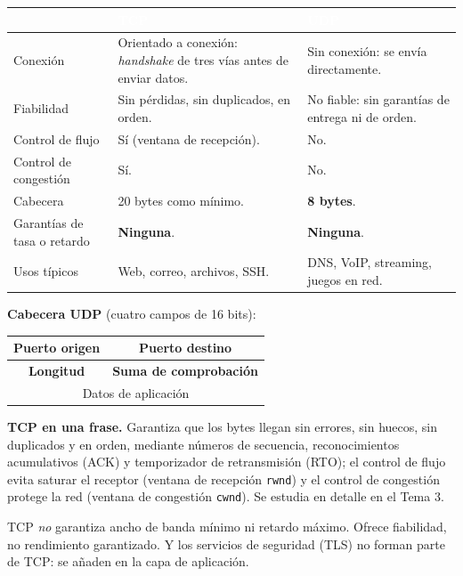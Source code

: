 \documentclass[11pt,a4paper]{article}
\newcommand{\hd}[1]{\cellcolor{uahblue}\textcolor{white}{\textbf{#1}}}
\begin{document}
\begin{tabularx}{\textwidth}{@{}L{3.6cm}XX@{}}
\toprule
 & \hd{TCP} & \hd{UDP} \\
\midrule
Conexión & Orientado a conexión: \emph{handshake} de tres vías antes de enviar datos. & Sin conexión: se envía directamente. \\
Fiabilidad & Sin pérdidas, sin duplicados, en orden. & No fiable: sin garantías de entrega ni de orden. \\
Control de flujo & Sí (ventana de recepción). & No. \\
Control de congestión & Sí. & No. \\
Cabecera & 20 bytes como mínimo. & \textbf{8 bytes}. \\
Garantías de tasa o retardo & \textbf{Ninguna}. & \textbf{Ninguna}. \\
Usos típicos & Web, correo, archivos, SSH. & DNS, VoIP, streaming, juegos en red. \\
\bottomrule
\end{tabularx}

\textbf{Cabecera UDP} (cuatro campos de 16 bits):

\begin{center}
\begin{tabular}{|c|c|}
\hline
\textbf{Puerto origen} & \textbf{Puerto destino} \\ \hline
\textbf{Longitud} & \textbf{Suma de comprobación} \\ \hline
\multicolumn{2}{|c|}{Datos de aplicación} \\ \hline
\end{tabular}
\end{center}

\textbf{TCP en una frase.} Garantiza que los bytes llegan sin errores, sin huecos, sin duplicados y en orden, mediante números de secuencia, reconocimientos acumulativos (ACK) y temporizador de retransmisión (RTO); el control de flujo evita saturar el receptor (ventana de recepción \texttt{rwnd}) y el control de congestión protege la red (ventana de congestión \texttt{cwnd}). Se estudia en detalle en el Tema 3.

\begin{ojo}
TCP \emph{no} garantiza ancho de banda mínimo ni retardo máximo. Ofrece fiabilidad, no rendimiento garantizado. Y los servicios de seguridad (TLS) no forman parte de TCP: se añaden en la capa de aplicación.
\end{ojo}
\end{document}
